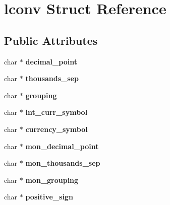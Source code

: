 \hypertarget{structlconv}{}\section{lconv Struct Reference}
\label{structlconv}
\subsection*{Public Attributes}
\begin{DoxyCompactItemize}
\item 
\mbox{\label{structlconv_a445e27fc7f797c8cca97b381f062fb60}} 
char $\ast$ {\bfseries decimal\+\_\+point}
\item 
\mbox{\label{structlconv_aede8dfaac91d7b4e6b7fb0d96184d74d}} 
char $\ast$ {\bfseries thousands\+\_\+sep}
\item 
\mbox{\label{structlconv_a46e468755a823be50de20f36be5ff2be}} 
char $\ast$ {\bfseries grouping}
\item 
\mbox{\label{structlconv_abaeeafb02b68ba58c549458b196b9325}} 
char $\ast$ {\bfseries int\+\_\+curr\+\_\+symbol}
\item 
\mbox{\label{structlconv_af3657bb8bf2a83a868cdeb0b108ab921}} 
char $\ast$ {\bfseries currency\+\_\+symbol}
\item 
\mbox{\label{structlconv_a1aa08afe707c1d5d40b4d01369176480}} 
char $\ast$ {\bfseries mon\+\_\+decimal\+\_\+point}
\item 
\mbox{\label{structlconv_a4f04f4fd9ea670d21fc76fb5c77c032d}} 
char $\ast$ {\bfseries mon\+\_\+thousands\+\_\+sep}
\item 
\mbox{\label{structlconv_a12ecf5d2f7ceb0cfe0f66fd3200eef54}} 
char $\ast$ {\bfseries mon\+\_\+grouping}
\item 
\mbox{\label{structlconv_a74bf5f6f32624be629f7de0dabd58a96}} 
char $\ast$ {\bfseries positive\+\_\+sign}
\item 
\mbox{\label{structlconv_a40dbb1b1d7fdf4926145138f5d8f6f5f}} 

\end{DoxyCompactItemize}
